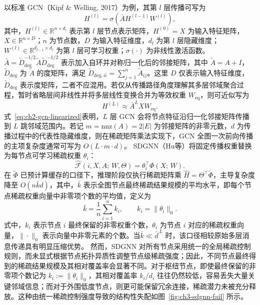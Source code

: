 以标准 GCN\cite{Kipf2017GCN}（Kipf \& Welling, 2017）为例，其第 $l$ 层传播可写为
\begin{equation}
  H^{(l)} = \sigma\!\left(\bar{A} H^{(l-1)} W^{(l)}\right),
  \label{eq:ch2-gcn-layer}
\end{equation}
其中，$H^{(l)}\in\mathbb{R}^{n\times d_l}$ 表示第 $l$ 层节点表示矩阵，$H^{(0)}=X$ 为输入特征矩阵，$X\in\mathbb{R}^{n\times D}$；$n$ 为节点数，$D$ 为输入特征维度，$d_l$ 为第 $l$ 层隐藏维度；$W^{(l)}\in\mathbb{R}^{d_{l-1}\times d_l}$ 为第 $l$ 层可学习权重；$\sigma(\cdot)$ 为非线性激活函数。$\bar{A}=\tilde{D}_{\mathrm{deg}}^{-1/2}\tilde{A}\tilde{D}_{\mathrm{deg}}^{-1/2}$ 表示加入自环并对称归一化后的邻接矩阵，其中 $\tilde{A}=A+I$，$\tilde{D}_{\mathrm{deg}}$ 为 $\tilde{A}$ 的度矩阵，满足 $\tilde{D}_{\mathrm{deg},ii}=\sum_{j=1}^{n}\tilde{A}_{ij}$。这里 $D$ 仅表示输入特征维度，$\tilde{D}_{\mathrm{deg}}$ 表示度矩阵，二者不应混用。若仅从传播路径角度理解其多层邻域聚合过程，暂时省略层间非线性并将多层线性变换合并为等效权重 $W_{\mathrm{eq}}$，则可近似写为
\begin{equation}
  H^{(L)} \approx \bar{A}^{L} X W_{\mathrm{eq}}.
  \label{eq:ch2-gcn-linearized}
\end{equation}
式~\eqref{eq:ch2-gcn-linearized}表明，$L$ 层 GCN 会将节点特征沿归一化邻接矩阵传播到 $L$ 跳邻域范围内。若记 $m=\mathrm{nnz}(A)=2|E|$ 为邻接矩阵的非零元数，$d$ 为传播过程中的代表性隐藏维度，则在稀疏矩阵乘法实现下，GCN 全图一次前向传播的主项复杂度通常可写为 $O(L\cdot m\cdot d)$。
SDGNN\cite{Hu2024SDGNN}（Hu等）将固定传播权重替换为每节点可学习稀疏权重 $\theta_i$：
\begin{equation}
  \hat{\mathcal{F}}(i, X, A;\, W, \Theta) = \theta_i^\top \Phi(X;\, W).
  \label{eq:ch3-sdgnn-infer}
\end{equation}
在 $\tilde{\Phi}$ 已预计算缓存的口径下，推理阶段仅执行稀疏矩阵乘
$\hat{H}=\Theta^\top\tilde{\Phi}$，主导复杂度降至 $O(n\bar{k}d)$，其中，$\bar{k}$ 表示全图节点最终稀疏结果规模的平均水平，即每个节点稀疏权重向量中非零项个数的平均值，定义为
\begin{equation}
  \bar{k}
  =
  \frac{1}{n}\sum_{i=1}^{n}k_i,
  \qquad
  k_i=\|\theta_i\|_0.
  \label{eq:ch2-average-sparse-budget}
\end{equation}
式中，$k_i$ 表示节点 $i$ 最终保留的非零权重个数，$\theta_i$ 为节点 $i$ 对应的稀疏权重向量，$\|\cdot\|_0$ 表示向量中非零元素的个数。当$\bar{k}\ll\bar{d}^{\,L}$ 时，该口径相较原始多层消息传递具有明显压缩优势。
然而，SDGNN 对所有节点采用统一的全局稀疏控制规则，而未显式根据节点拓扑异质性调整节点级稀疏强度；因此，不同节点最终得到的稀疏结果规模及其相对覆盖率会显著不同。对于枢纽节点，即使最终保留的非零项个数记为 $k_i:=\|\theta_i\|_0$，其相对覆盖率 $k_i/d_i$ 往往仍然较低，容易丢失大量关键邻域信息；而对于外围低度节点，则更可能保留冗余连接，稀疏潜力未被充分释放。这种由统一稀疏控制强度导致的结构性失配如图~\ref{fig:ch3-sdgnn-fail} 所示。

